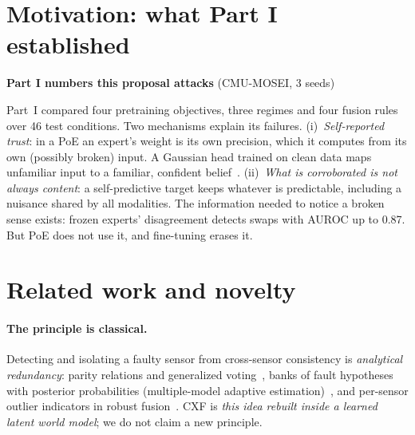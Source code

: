 \documentclass[10pt,twocolumn]{article}
\begin{document}
\section{Motivation: what Part I established}
\begin{table}[h]
\centering\small
\colorbox{keybg}{\parbox{0.96\columnwidth}{\centering
\textbf{Part I numbers this proposal attacks} (CMU-MOSEI, 3 seeds)\\[2pt]
}}
\end{table}
Part~I compared four pretraining objectives, three regimes and four fusion rules over 46 test conditions. Two
mechanisms explain its failures. (i)~\emph{Self-reported trust}: in a PoE an expert's weight is its own precision,
which it computes from its own (possibly broken) input. A Gaussian head trained on clean data maps unfamiliar
input to a familiar, confident belief~\cite{kendall2017uncertainties}. (ii)~\emph{What is corroborated is not always
content}: a self-predictive target keeps whatever is predictable, including a nuisance shared by all modalities.
The information needed to notice a broken sense exists: frozen experts' disagreement detects swaps with AUROC up
to 0.87. But PoE does not use it, and fine-tuning erases it.

\section{Related work and novelty}
\paragraph{The principle is classical.} Detecting and isolating a faulty sensor from cross-sensor consistency is
\emph{analytical redundancy}: parity relations and generalized voting~\cite{chow1980failure}, banks of fault hypotheses
with posterior probabilities (multiple-model adaptive estimation)~\cite{roumeliotis1998fault}, and per-sensor outlier
indicators in robust fusion~\cite{wang2022outlier}. CXF is \emph{this idea rebuilt inside a learned latent world
model}; we do not claim a new principle.
\end{document}
